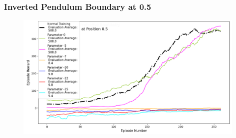 \documentclass{beamer}
\begin{document}
\begin{frame}
\begin{figure}
        \end{figure}

\end{frame}

\begin{frame}
\frametitle{Inverted Pendulum Boundary at 0.5}
\begin{figure}
    \centering
	\includegraphics[scale=0.4]{Cartpole_with_Boundary_at_0.5}
\end{figure}
\end{frame}
\end{document}
